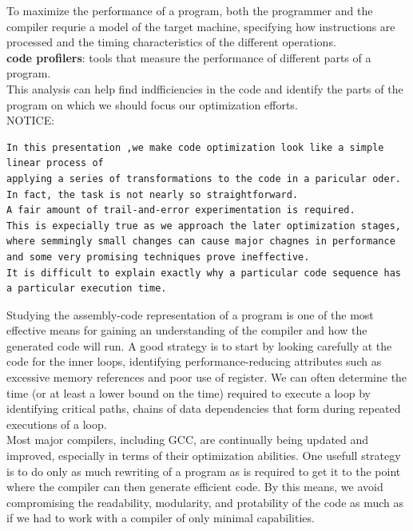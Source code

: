 \documentclass[11pt]{article}
\begin{document}
To maximize the performance of a program, both the programmer and the compiler requrie a model of the target machine, specifying how instructions are processed and the timing characteristics of the different operations.\\


\textbf{code profilers}: tools that measure the performance of different parts of a program.\\
This analysis can help find indfficiencies in the code and identify the parts of the program on which we should focus our optimization efforts.\\

NOTICE:\\
\begin{verbatim}
In this presentation ,we make code optimization look like a simple linear process of 
applying a series of transformations to the code in a paricular oder. 
In fact, the task is not nearly so straightforward. 
A fair amount of trail-and-error experimentation is required.
This is expecially true as we approach the later optimization stages,
where semmingly small changes can cause major chagnes in performance
and some very promising techniques prove ineffective.
It is difficult to explain exactly why a particular code sequence has a particular execution time.
\end{verbatim}


Studying the assembly-code representation of a program is one of the most effective means for gaining an understanding of the compiler and how the generated code will run. A good strategy is to start by looking carefully at the code for the inner loops, identifying performance-reducing attributes such as excessive memory references and poor use of register. We can often determine the time (or at least a lower bound on the time) required to execute a loop by identifying critical paths, chains of data dependencies that form during repeated executions of a loop.\\


Most major compilers, including GCC, are continually being updated and improved, especially in terms of their optimization abilities. One usefull strategy is to do only as much rewriting of a program as is required to get it to the point where the compiler can then generate efficient code. By this means, we avoid compromising the readability, modularity, and protability of the code as much as if we had to work with a compiler of only minimal capabilities.\\
\end{document}
